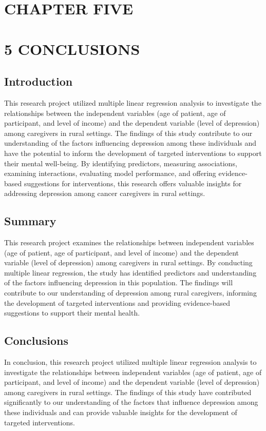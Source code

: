 \documentclass[12pt]{article}
\begin{document}
	\section*{CHAPTER FIVE}
	\section*{5 CONCLUSIONS}
	\setcounter{section}{5}
	\setcounter{subsection}{0}
	\subsection{Introduction}
	This research project utilized multiple linear regression analysis to investigate the relationships between the independent variables (age of patient, age of participant, and level of income) and the dependent variable (level of depression) among caregivers in rural settings. The findings of this study contribute to our understanding of the factors influencing depression among these individuals and have the potential to inform the development of targeted interventions to support their mental well-being. By identifying predictors, measuring associations, examining interactions, evaluating model performance, and offering evidence-based suggestions for interventions, this research offers valuable insights for addressing depression among cancer caregivers in rural settings.
	\subsection{Summary}
	This research project examines the relationships between independent variables (age of patient, age of participant, and level of income) and the dependent variable (level of depression) among caregivers in rural settings. By conducting multiple linear regression, the study has identified predictors and understanding of the factors influencing depression in this population. The findings will contribute to our understanding of depression among rural caregivers, informing the development of targeted interventions and providing evidence-based suggestions to support their mental health.
	\subsection{Conclusions}
	In conclusion, this research project utilized multiple linear regression analysis to investigate the relationships between independent variables (age of patient, age of participant, and level of income) and the dependent variable (level of depression) among caregivers in rural settings. The findings of this study have contributed significantly to our understanding of the factors that influence depression among these individuals and can provide valuable insights for the development of targeted interventions.\\
	
\end{document}
